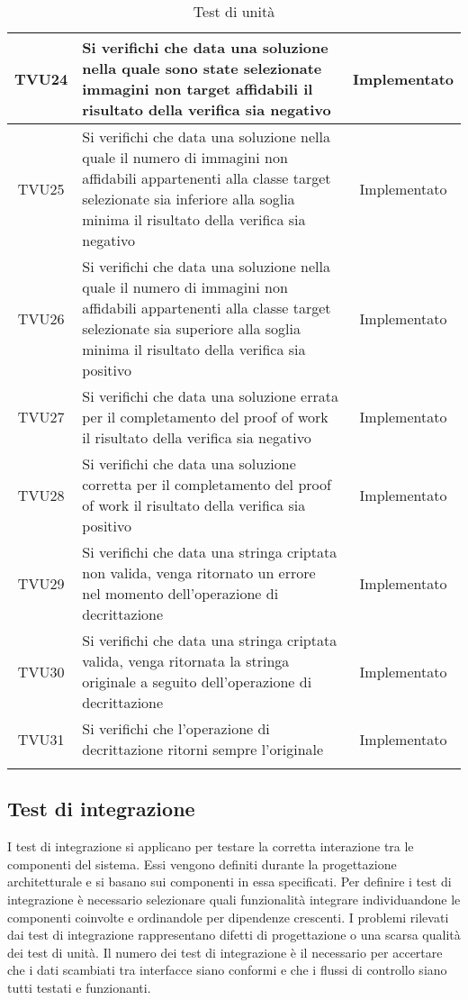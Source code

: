 \begin{center}
\begin{xltabular}{\textwidth}{|c|X|c|}
		\hline
		TVU24 & Si verifichi che data una soluzione nella quale sono state selezionate immagini non target affidabili il risultato della verifica sia negativo & Implementato\\
		\hline
		TVU25 & Si verifichi che data una soluzione nella quale il numero di immagini non affidabili appartenenti alla classe target selezionate sia inferiore alla soglia minima il risultato della verifica sia negativo & Implementato\\
		\hline
		TVU26 & Si verifichi che data una soluzione nella quale il numero di immagini non affidabili appartenenti alla classe target selezionate sia superiore alla soglia minima il risultato della verifica sia positivo & Implementato\\
		\hline
		TVU27 & Si verifichi che data una soluzione errata per il completamento del proof of work il risultato della verifica sia negativo & Implementato\\
		\hline
		TVU28 & Si verifichi che data una soluzione corretta per il completamento del proof of work il risultato della verifica sia positivo & Implementato\\
		\hline
		TVU29 & Si verifichi che data una stringa criptata non valida, venga ritornato un errore nel momento dell'operazione di decrittazione & Implementato\\
		\hline
		TVU30 & Si verifichi che data una stringa criptata valida, venga ritornata la stringa originale a seguito dell'operazione di decrittazione & Implementato\\
		\hline
		TVU31 & Si verifichi che l'operazione di decrittazione ritorni sempre l'originale & Implementato\\
		\hline
		\caption{Test di unità}
	\end{xltabular}
\end{center}


\subsection{Test di integrazione}
I test di integrazione si applicano per testare la corretta interazione tra le componenti del sistema. Essi vengono definiti durante la progettazione architetturale e si basano sui componenti in essa specificati.
Per definire i test di integrazione è necessario selezionare quali funzionalità integrare individuandone le componenti coinvolte e ordinandole per dipendenze crescenti.
I problemi rilevati dai test di integrazione rappresentano difetti di progettazione o una scarsa qualità dei test di unità. Il numero dei test di integrazione è il necessario per accertare che i dati scambiati tra interfacce siano conformi e che i flussi di controllo siano tutti testati e funzionanti.

